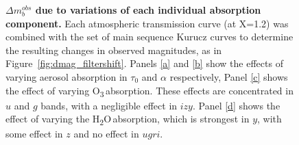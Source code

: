 \documentclass[12pt,preprint]{aastex}
\newcommand{\water}   {H\textsubscript{2}O}
\newcommand{\ozone}    {O\textsubscript{3}}
\begin{document}
\begin{figure}
{\begin{minipage}{6.5in}
\caption{{\small
{\bf $\Delta m_b^{obs}$ due to variations of each
individual absorption component.} Each atmospheric transmission curve
(at X=1.2) was combined with the set of main sequence Kurucz curves to
determine the resulting changes in observed magnitudes, as in
Figure~\ref{fig:dmag_filtershift}. Panels \ref{a} and \ref{b} show the
effects of varying aerosol absorption in $\tau_0$ and $\alpha$
respectively, Panel \ref{c} shows the effect of varying \ozone\,absorption. These
effects are concentrated in $u$ and $g$ bands, with a negligible effect
in $izy$. Panel \ref{d} shows the effect of varying the \water\,absorption,
which is strongest in $y$, with some effect in $z$ and no effect in
$ugri$.
}}
\label{fig:dmag_atm_comps}
\end{minipage}
}
\end{figure}
\end{document}
